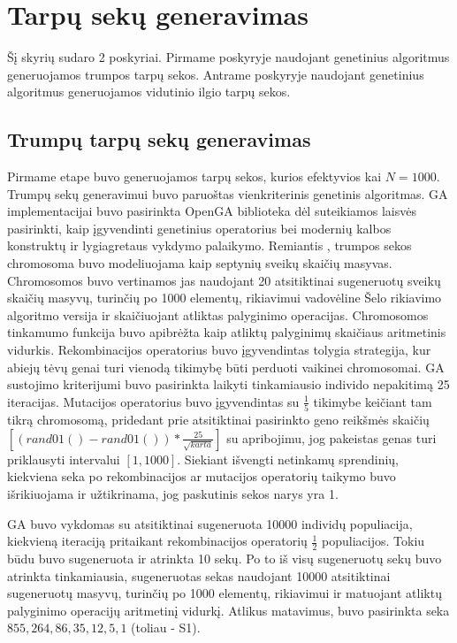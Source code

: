 \documentclass{VUMIFInfKursinis}
\begin{document}
\section{Tarpų sekų generavimas}

Šį skyrių sudaro 2 poskyriai.
Pirmame poskyryje naudojant genetinius algoritmus generuojamos trumpos tarpų sekos.
Antrame poskyryje naudojant genetinius algoritmus generuojamos vidutinio ilgio tarpų sekos.

\subsection{Trumpų tarpų sekų generavimas}
Pirmame etape buvo generuojamos tarpų sekos, kurios efektyvios kai $N=1000$.
Trumpų sekų generavimui buvo paruoštas vienkriterinis genetinis algoritmas.
GA implementacijai buvo pasirinkta OpenGA biblioteka \cite{mohammadi2017openga}
dėl suteikiamos laisvės pasirinkti, kaip įgyvendinti genetinius operatorius bei modernių kalbos konstruktų ir lygiagretaus vykdymo palaikymo.
Remiantis \cite{simpson1999faster}, trumpos sekos chromosoma buvo modeliuojama kaip
septynių sveikų skaičių masyvas.
Chromosomos buvo vertinamos jas naudojant 20 atsitiktinai
sugeneruotų sveikų skaičių masyvų, turinčių po 1000 elementų, rikiavimui vadovėline Šelo rikiavimo algoritmo versija ir skaičiuojant atliktas palyginimo operacijas.
Chromosomos tinkamumo funkcija buvo apibrėžta kaip atliktų palyginimų skaičiaus aritmetinis vidurkis.
Rekombinacijos operatorius buvo įgyvendintas tolygia strategija, kur abiejų tėvų genai turi vienodą tikimybę
būti perduoti vaikinei chromosomai.
GA sustojimo kriterijumi buvo pasirinkta laikyti tinkamiausio individo nepakitimą 25 iteracijas.
Mutacijos operatorius buvo įgyvendintas su $\frac{1}{5}$ tikimybe keičiant tam tikrą chromosomą,
pridedant prie atsitiktinai pasirinkto geno reikšmės skaičių $\left[(rand01()-rand01())*\frac{25}{\sqrt{karta}}\right]$ su apribojimu, jog pakeistas genas turi priklausyti intervalui $[1, 1000]$.
Siekiant išvengti netinkamų sprendinių, kiekviena seka po rekombinacijos ar mutacijos operatorių taikymo buvo išrikiuojama ir
užtikrinama, jog paskutinis sekos narys yra 1.

GA buvo vykdomas su atsitiktinai sugeneruota 10000 individų populiacija, kiekvieną iteraciją pritaikant rekombinacijos operatorių
$\frac{1}{2}$ populiacijos.
Tokiu būdu buvo sugeneruota ir atrinkta 10 sekų.
Po to iš visų sugeneruotų sekų buvo atrinkta tinkamiausia, sugeneruotas sekas naudojant 10000 atsitiktinai sugeneruotų masyvų, turinčių po 1000 elementų, rikiavimui
ir matuojant atliktų palyginimo operacijų aritmetinį vidurkį.
Atlikus matavimus, buvo pasirinkta seka $855, 264, 86, 35, 12, 5, 1$ (toliau - S1).
\end{document}
